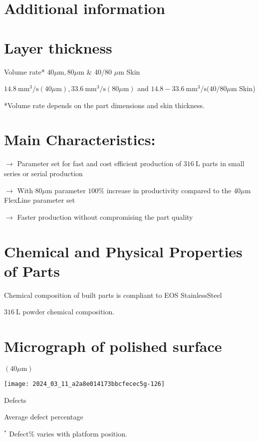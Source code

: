 \documentclass[10pt]{article}
\begin{document}
\section*{Additional information}
\section*{Layer thickness}
Volume rate* $40 \mu \mathrm{m}, 80 \mu \mathrm{m}$ \& 40/80 $\mu \mathrm{m}$ Skin

$14.8 \mathrm{~mm}^{3} / \mathrm{s}(40 \mu \mathrm{m}), 33.6 \mathrm{~mm}^{3} / \mathrm{s}(80 \mu \mathrm{m})$ and $14.8-33.6 \mathrm{~mm}^{3} / \mathrm{s}(40 / 80 \mu \mathrm{m}$ Skin)

*Volume rate depends on the part dimensions and skin thickness.

\section*{Main Characteristics:}
$\longrightarrow$ Parameter set for fast and cost efficient production of $316 \mathrm{~L}$ parts in small series or serial production

$\longrightarrow$ With $80 \mu \mathrm{m}$ parameter $100 \%$ increase in productivity compared to the $40 \mu \mathrm{m}$ FlexLine parameter set

$\longrightarrow$ Faster production without compromising the part quality

\section*{Chemical and Physical Properties of Parts}
Chemical composition of built parts is compliant to EOS StainlessSteel

$316 \mathrm{~L}$ powder chemical composition.

\section*{Micrograph of polished surface}
$(40 \mu \mathrm{m})$

\begin{center}
\texttt{[image: 2024\_03\_11\_a2a8e014173bbcfecec5g-126]}
\end{center}

Defects

Average defect percentage

${ }^{*}$ Defect\% varies with platform position.
\end{document}

